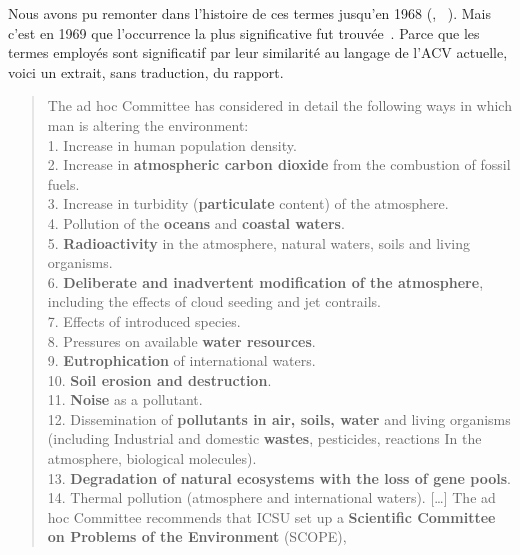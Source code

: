 Nous avons pu remonter dans l'histoire de ces termes jusqu'en 1968 (\citeauthor{milsum_technosphere_1968}, ~\cite{milsum_technosphere_1968}).
Mais c'est en 1969 que l’occurrence la plus significative fut trouvée~\cite{iugg_i.u.g.g._1969}.
Parce que les termes employés sont significatif par leur similarité au langage de l'ACV actuelle, voici un extrait, sans traduction, du rapport.
\blockcquote{iugg_i.u.g.g._1969}{The ad hoc Committee has considered in detail the following ways in which man is altering the environment:\\
1. Increase in human population density.\\
2. Increase in \textbf{atmospheric carbon dioxide} from the combustion of fossil fuels.\\
3. Increase in turbidity (\textbf{particulate} content) of the atmosphere.\\
4. Pollution of the \textbf{oceans} and \textbf{coastal waters}.\\
5. \textbf{Radioactivity} in the atmosphere, natural waters, soils and living organisms.\\
6. \textbf{Deliberate and inadvertent modification of the atmosphere}, including the effects of cloud seeding and jet contrails.\\
7. Effects of introduced species.\\
8. Pressures on available \textbf{water resources}.\\
9. \textbf{Eutrophication} of international waters.\\
10. \textbf{Soil erosion and destruction}.\\
11. \textbf{Noise} as a pollutant.\\
12. Dissemination of \textbf{pollutants in air, soils, water} and living organisms (including Industrial and domestic \textbf{wastes}, pesticides, reactions In the atmosphere, biological molecules).\\
13. \textbf{Degradation of natural ecosystems with the loss of gene pools}.\\
14. Thermal pollution (atmosphere and international waters).
[\ldots] The ad hoc Committee recommends that ICSU set up a \textbf{Scientific Committee on Problems of the Environment} (SCOPE),
}
